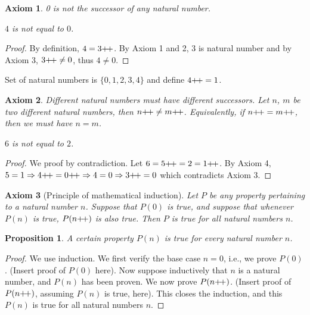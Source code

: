 \documentclass[12pt]{article}
\newtheorem{axiom}{Axiom}
\newtheorem{proposition}{Proposition}[section]
\theoremstyle{remark}
\begin{document}
\begin{axiom}
    0 is not the successor of any natural number.
\end{axiom}

\begin{example}
	\textit{$4$ is not equal to $0$.}		  
\end{example}

\begin{proof}
    By definition, $4 = 3\inc$. By Axiom 1 and 2, 3 is natural number and by Axiom 3, $3\inc \neq 0$, thus $4 \neq 0$.
\end{proof}

\begin{cexample}
	Set of natural numbers is $\{0, 1, 2, 3, 4\}$ and define $4\inc = 1$.
\end{cexample}

\begin{axiom}
	Different natural numbers must have different successors. Let $n$, $m$ be two different natural numbers, then $n\inc \neq m\inc$. Equivalently, if $n\inc = m\inc$, then we must have $n=m$.
\end{axiom}

\begin{example}
	\textit{$6$ is not equal to $2$.}
\end{example}

\begin{proof}
    We proof by contradiction. Let $6 = 5\inc = 2 = 1\inc $. By Axiom 4, $5 = 1 \Rightarrow 4\inc = 0\inc \Rightarrow 4 = 0 \Rightarrow 3\inc = 0$ which contradicts Axiom 3.
\end{proof}

\begin{axiom}[Principle of mathematical induction]
	Let $P$ be any property pertaining to a natural number $n$. Suppose that $P(0)$ is true, and suppose that whenever $P(n)$ is true, $P(n\inc)$ is also true. Then $P$ is true for all natural numbers $n$. 
\end{axiom}

\begin{proposition}
    A certain property $ P(n) $ is true for every natural number $ n $.
\end{proposition}

\begin{proof}
	We use induction. We first verify the base case $ n = 0 $, i.e., we prove $ P(0) $. (Insert proof of $ P(0) $ here). Now suppose inductively that $ n $ is a natural number, and $ P(n) $ has been proven. We now prove $ P(n\inc) $. (Insert proof of $ P(n\inc) $, assuming $ P(n) $ is true, here). This closes the induction, and this $ P(n) $ is true for all natural numbers $ n $.
\end{proof}
\end{document}
